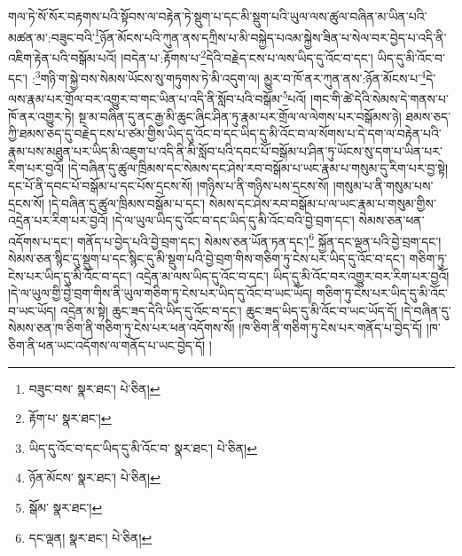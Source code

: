 གལ་ཏེ་སོ་སོར་བརྟགས་པའི་སྟོབས་ལ་བརྟེན་ཏེ་སྡུག་པ་དང་མི་སྡུག་པའི་ཡུལ་ལས་ཚུལ་བཞིན་མ་ཡིན་པའི་མཚན་མ་:བཟུང་བའི་\footnote{བཟུང་བས་  སྣར་ཐང་།  པེ་ཅིན། }ཉོན་མོངས་པའི་ཀུན་ནས་དཀྲིས་པ་མི་བསྐྱེད་པའམ་སྐྱེས་ཟིན་པ་སེལ་བར་བྱེད་པ་འདི་ནི་འཇིག་རྟེན་པའི་བསྒོམ་པའོ། །བདེན་པ་:རྟོགས་པ་\footnote{རྟོག་པ་  སྣར་ཐང་། }དེའི་བརྗེད་ངས་པ་ལས་ཡིད་དུ་འོང་བ་དང་། ཡིད་དུ་མི་འོང་བ་དང་། :\footnote{ཡིད་དུ་འོང་བ་དང་ཡིད་དུ་མི་འོང་བ་  སྣར་ཐང་།  པེ་ཅིན། }གཉི་ག་སྐྱེ་བས་སེམས་ཡོངས་སུ་གཏུགས་ཏེ་མི་འདུག་ལ། མྱུར་བ་ཁོ་ནར་ཀུན་ནས་:ཉོན་མོངས་པ་\footnote{ཉོན་མོངས་  སྣར་ཐང་།  པེ་ཅིན། }དེ་ལས་རྣམ་པར་གྲོལ་བར་འགྱུར་བ་གང་ཡིན་པ་འདི་ནི་སློབ་པའི་བསྒོམ་\footnote{སྒོམ་  སྣར་ཐང་། }པའོ། །གང་གི་ཚེ་དེའི་སེམས་དེ་གནས་པ་ཁོ་ནར་འགྱུར་ཏེ། སྔ་མ་བཞིན་དུ་ནང་རྒྱ་མི་ཆུང་ཞིང་ཤིན་ཏུ་རྣམ་པར་གྲོལ་ལ་ལེགས་པར་བསྒོམས་ཉེ། ཐམས་ཅད་ཀྱི་ཐམས་ཅད་དུ་བརྗེད་ངས་པ་ཙམ་གྱིས་ཡིད་དུ་འོང་བ་དང་ཡིད་དུ་མི་འོང་བ་ལ་སོགས་པ་དེ་དག་ལ་བརྟེན་པའི་རྣམ་པས་མཐུན་པར་ཡིད་མི་འཇུག་པ་འདི་ནི་མི་སློབ་པའི་དབང་པོ་བསྒོམ་པ་ཤིན་ཏུ་ཡོངས་སུ་དག་པ་ཡིན་པར་རིག་པར་བྱའོ། །དེ་བཞིན་དུ་ཚུལ་ཁྲིམས་དང་སེམས་དང་ཤེས་རབ་བསྒོམ་པ་ཡང་རྣམ་པ་གསུམ་དུ་རིག་པར་བྱ་སྟེ། དང་པོ་ནི་དབང་པོ་བསྒོམ་པ་དང་པོས་དྲངས་སོ། །གཉིས་པ་ནི་གཉིས་པས་དྲངས་སོ། །གསུམ་པ་ནི་གསུམ་པས་དྲངས་སོ། །དེ་བཞིན་དུ་ཚུལ་ཁྲིམས་བསྒོམ་པ་དང་། སེམས་དང་ཤེས་རབ་བསྒོམ་པ་ལ་ཡང་རྣམ་པ་གསུམ་གྱིས་འདྲེན་པར་རིག་པར་བྱའོ། །དེ་ལ་ཡུལ་ཡིད་དུ་འོང་བ་དང་ཡིད་དུ་མི་འོང་བའི་བྱེ་བྲག་དང་། སེམས་ཅན་ཕན་འདོགས་པ་དང་། གནོད་པ་བྱེད་པའི་བྱེ་བྲག་དང་། སེམས་ཅན་ཡོན་ཏན་དང་།\footnote{དང་ལྡན།  སྣར་ཐང་།  པེ་ཅིན། } སྐྱོན་དང་ལྡན་པའི་བྱེ་བྲག་དང་། སེམས་ཅན་སྙིང་དུ་སྡུག་པ་དང་སྙིང་དུ་མི་སྡུག་པའི་བྱེ་བྲག་གིས་གཅིག་ཏུ་ངེས་པར་ཡིད་དུ་འོང་བ་དང་། གཅིག་ཏུ་ངེས་པར་ཡིད་དུ་མི་འོང་བ་དང་། འདྲེན་མ་ལས་ཡིད་དུ་འོང་བ་དང་། ཡིད་དུ་མི་འོང་བར་འགྱུར་བར་རིག་པར་བྱའོ། །དེ་ལ་ཡུལ་གྱི་བྱེ་བྲག་གིས་ནི་ཡུལ་གཅིག་ཏུ་ངེས་པར་ཡིད་དུ་འོང་བ་ཡང་ཡོད། གཅིག་ཏུ་ངེས་པར་ཡིད་དུ་མི་འོང་བ་ཡང་ཡོད། འདྲེན་མ་སྟེ། ཆུང་ཟད་དེའི་ཡིད་དུ་འོང་བ་དང་། ཆུང་ཟད་ཡིད་དུ་མི་འོང་བ་ཡང་ཡོད་དོ། །དེ་བཞིན་དུ་སེམས་ཅན་ཁ་ཅིག་ནི་གཅིག་ཏུ་ངེས་པར་ཕན་འདོགས་སོ། །ཁ་ཅིག་ནི་གཅིག་ཏུ་ངེས་པར་གནོད་པ་བྱེད་དོ། །ཁ་ཅིག་ནི་ཕན་ཡང་འདོགས་ལ་གནོད་པ་ཡང་བྱེད་དོ། །
